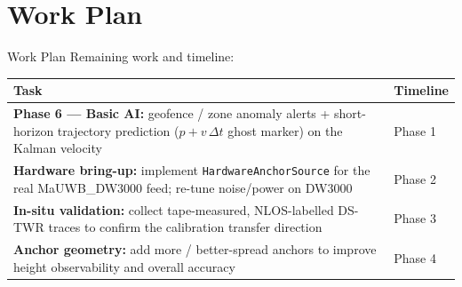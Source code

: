 \documentclass[aspectratio=169,10pt]{beamer}
\begin{document}
\section{Work Plan}
\begin{frame}{Work Plan}
  Remaining work and timeline:
  \begin{center}\small
  \begin{tabular}{p{6.5cm}l}
    \toprule
    Task & Timeline \\
    \midrule
    \textbf{Phase 6 --- Basic AI:} geofence / zone anomaly alerts + short-horizon
    trajectory prediction ($p + v\,\Delta t$ ghost marker) on the Kalman velocity & Phase 1 \\
    \textbf{Hardware bring-up:} implement \texttt{HardwareAnchorSource} for the real
    MaUWB\_DW3000 feed; re-tune noise/power on DW3000 & Phase 2 \\
    \textbf{In-situ validation:} collect tape-measured, NLOS-labelled DS-TWR traces to
    confirm the calibration transfer direction & Phase 3 \\
    \textbf{Anchor geometry:} add more / better-spread anchors to improve height
    observability and overall accuracy & Phase 4 \\
    \bottomrule
  \end{tabular}
  \end{center}
\end{frame}

\end{document}
